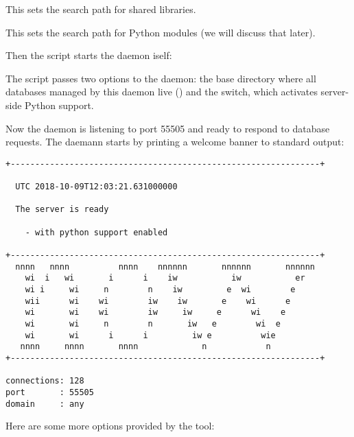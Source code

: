 This sets the search path for shared libraries.


This sets the search path for Python modules
(we will discuss that later).

Then the script starts the daemon iself:


The script passes two options to the daemon:
the base directory where all databases
managed by this daemon live ()
and the  switch, which activates
server-side Python support.

Now the daemon is listening to port 55505
and ready to respond to database requests.
The daemann starts by printing a welcome banner
to standard output:

\begingroup
\small
\begin{verbatim}
+---------------------------------------------------------------+ 
 
  UTC 2018-10-09T12:03:21.631000000
 
  The server is ready
 
    - with python support enabled
 
+---------------------------------------------------------------+ 
  nnnn   nnnn          nnnn    nnnnnn       nnnnnn       nnnnnn  
    wi  i   wi       i      i    iw           iw           er   
    wi i     wi     n        n    iw         e  wi        e    
    wii      wi    wi        iw    iw       e    wi      e        
    wi       wi    wi        iw     iw     e      wi    e        
    wi       wi     n        n       iw   e        wi  e        
    wi       wi      i      i         iw e          wie          
   nnnn     nnnn       nnnn             n            n            
+---------------------------------------------------------------+ 

connections: 128
port       : 55505
domain     : any
\end{verbatim}
\endgroup

Here are some more options provided by
the  tool:

